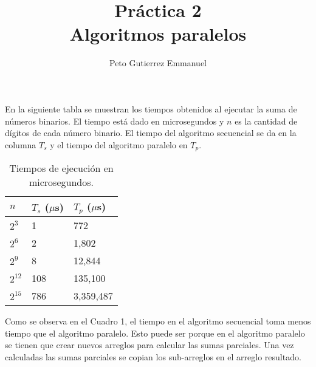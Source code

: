 \documentclass{article}
\title{Práctica 2\\Algoritmos paralelos}
\author{Peto Gutierrez Emmanuel}
\begin{document}
\maketitle

En la siguiente tabla se muestran los tiempos obtenidos al ejecutar la suma de números binarios. El tiempo está dado en microsegundos y $n$ es la cantidad de dígitos de cada número binario. El tiempo del algoritmo secuencial se da en la columna $T_s$ y el tiempo del algoritmo paralelo en $T_p$.

\begin{table}[htb]
\begin{center}
\begin{tabular}{|l|l|l|}
\hline
$n$ & $T_s$ ($\mu$s) & $T_p$ ($\mu$s) \\ \hline \hline
$2^{3}$ & 1 & 772 \\ \hline
$2^{6}$ & 2 & 1,802 \\ \hline
$2^{9}$ & 8 & 12,844 \\ \hline
$2^{12}$ & 108 & 135,100 \\ \hline
$2^{15}$ & 786 & 3,359,487 \\ \hline
\end{tabular}
\caption{Tiempos de ejecución en microsegundos.}
\end{center}
\label{table:1}
\end{table}

Como se observa en el Cuadro 1, el tiempo en el algoritmo secuencial toma menos tiempo que el algoritmo paralelo. Esto puede ser porque en el algoritmo paralelo se tienen que crear nuevos arreglos para calcular las sumas parciales. Una vez calculadas las sumas parciales se copian los sub-arreglos en el arreglo resultado.
\end{document}
